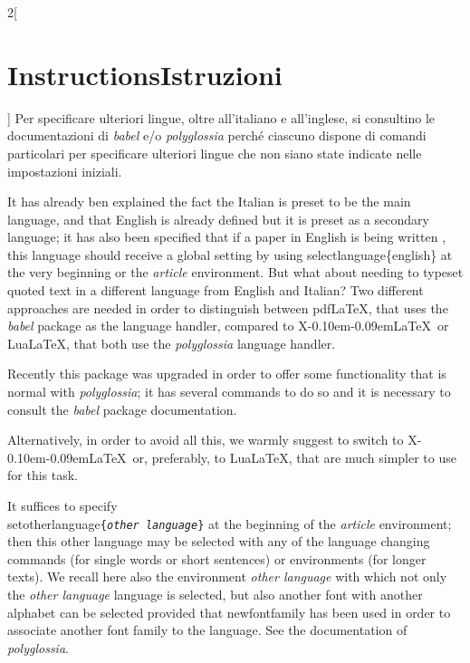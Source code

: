 \documentclass[12pt]{article}
\providecommand\pdfLaTeX{pdf\/\-\LaTeX}
\providecommand\XeLaTeX{X\kern-0.10em\raisebox{1.1ex}{\rotatebox{180}{E}}\kern-0.09em\-\LaTeX}
\providecommand\LuaLaTeX{Lua\-\LaTeX}
\providecommand\meta[1]{\textnormal{\textlangle\textit{#1}\textrangle}}
\providecommand\amb[1]{\textnormal{\slshape#1}}
\providecommand\cs[1]{\textnormal{\ttfamily\char92#1}}
\providecommand\marg[1]{\textnormal{\texttt{\{\meta{#1}\}}}}
\providecommand\Marg[1]{\textnormal{\ttfamily\{#1\}}}
\providecommand\pack[1]{\textnormal{\sffamily\slshape#1}}
\providecommand\english{\selectlanguage{english}}
\begin{document}
\begin{paracol}{2}[\section{Instructions\hspace{5.6em}Istruzioni}]
Per specificare ulteriori lingue, oltre all'italiano e all'inglese, si consultino le documentazioni di \pack{babel} e/o \pack{polyglossia} perché ciascuno  dispone di comandi particolari per specificare ulteriori lingue che non siano state indicate nelle impostazioni iniziali.

\english
It has already ben explained the fact the Italian is preset to be the main language, and that English is already defined but it is preset as a secondary language; it has also been specified that if a paper in English is being written , this language should receive a global setting by using  \cs{selectlanguage}\Marg{english} at the very beginning or the \amb{article} environment. But what about needing to typeset quoted text in a different language from English and Italian? Two different approaches are needed in order to distinguish between \pdfLaTeX, that uses the \pack{babel} package as the language handler, compared to \XeLaTeX\ or \LuaLaTeX, that both use the \pack{polyglossia} language handler.
\begin{description}[noitemsep]
\item[\pack{babel}] Recently this package was upgraded in order to offer some functionality that is normal with \pack{polyglossia}; it has several commands to do so and it is necessary to consult the \pack{babel} package documentation.

Alternatively, in order to avoid all this, we warmly suggest to switch to \XeLaTeX\ or, preferably, to \LuaLaTeX, that are much simpler to use for this task. 

%
\item[\pack{polyglossia}] It suffices to specify\\ \cs{setotherlanguage}\marg{other language} at the beginning of the \amb{article} environment; then this other language may be selected with any of the language changing commands (for single words or short sentences) or environments (for longer texts). We recall here also the environment \amb{other language} with which not only the \meta{other language} language is selected, but also another font with another alphabet can be selected provided that \cs{newfontfamily} has been used in order to associate another font family to the language. See the documentation of \pack{polyglossia}.
%
\end{description}


\end{paracol}
\end{document}
